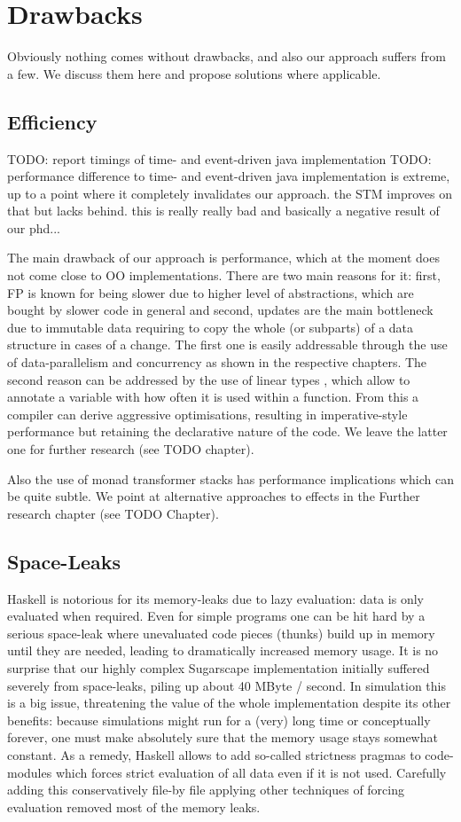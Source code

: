 \section{Drawbacks}
\label{sec:drawbacks}
Obviously nothing comes without drawbacks, and also our approach suffers from a few. We discuss them here and propose solutions where applicable.

\subsection{Efficiency}
TODO: report timings of time- and event-driven java implementation
TODO: performance difference to time- and event-driven java implementation is extreme, up to a point where it completely invalidates our approach. the STM improves on that but lacks behind. this is really really bad and basically a negative result of our phd...


The main drawback of our approach is performance, which at the moment does not come close to OO implementations. There are two main reasons for it: first, FP is known for being slower due to higher level of abstractions, which are bought by slower code in general and second, updates are the main bottleneck due to immutable data requiring to copy the whole (or subparts) of a data structure in cases of a change. The first one is easily addressable through the use of data-parallelism and concurrency as shown in the respective chapters. The second reason can be addressed by the use of linear types \cite{bernardy_linear_2017}, which allow to annotate a variable with how often it is used within a function. From this a compiler can derive aggressive optimisations, resulting in imperative-style performance but retaining the declarative nature of the code. We leave the latter one for further research (see TODO chapter).

Also the use of monad transformer stacks has performance implications which can be quite subtle. We point at alternative approaches to effects in the Further research chapter (see TODO Chapter).

\subsection{Space-Leaks}
Haskell is notorious for its memory-leaks due to lazy evaluation: data is only evaluated when required. Even for simple programs one can be hit hard by a serious space-leak where unevaluated code pieces (thunks) build up in memory until they are needed, leading to dramatically increased memory usage. It is no surprise that our highly complex Sugarscape implementation initially suffered severely from space-leaks, piling up about 40 MByte / second. In simulation this is a big issue, threatening the value of the whole implementation despite its other benefits: because simulations might run for a (very) long time or conceptually forever, one must make absolutely sure that the memory usage stays somewhat constant. As a remedy, Haskell allows to add so-called strictness pragmas to code-modules which forces strict evaluation of all data even if it is not used. Carefully adding this conservatively file-by file applying other techniques of forcing evaluation removed most of the memory leaks.

